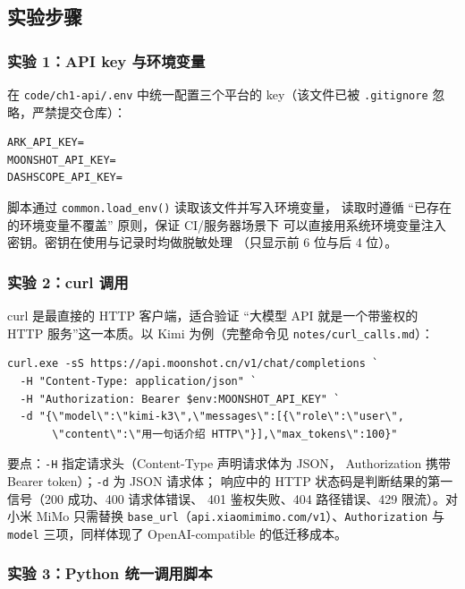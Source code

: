 \subsection{实验步骤}

\subsubsection{实验 1：API key 与环境变量}

在 \texttt{code/ch1-api/.env} 中统一配置三个平台的 key（该文件已被
\texttt{.gitignore} 忽略，严禁提交仓库）：

\begin{verbatim}
ARK_API_KEY=
MOONSHOT_API_KEY=
DASHSCOPE_API_KEY=
\end{verbatim}

脚本通过 \texttt{common.load\_env()} 读取该文件并写入环境变量，
读取时遵循 ``已存在的环境变量不覆盖'' 原则，保证 CI/服务器场景下
可以直接用系统环境变量注入密钥。密钥在使用与记录时均做脱敏处理
（只显示前 6 位与后 4 位）。

\subsubsection{实验 2：curl 调用}

curl 是最直接的 HTTP 客户端，适合验证 ``大模型 API 就是一个带鉴权的 HTTP
服务''这一本质。以 Kimi 为例（完整命令见 \texttt{notes/curl\_calls.md}）：

\begin{verbatim}
curl.exe -sS https://api.moonshot.cn/v1/chat/completions `
  -H "Content-Type: application/json" `
  -H "Authorization: Bearer $env:MOONSHOT_API_KEY" `
  -d "{\"model\":\"kimi-k3\",\"messages\":[{\"role\":\"user\",
       \"content\":\"用一句话介绍 HTTP\"}],\"max_tokens\":100}"
\end{verbatim}

要点：\texttt{-H} 指定请求头（Content-Type 声明请求体为 JSON，
Authorization 携带 Bearer token）；\texttt{-d} 为 JSON 请求体；
响应中的 HTTP 状态码是判断结果的第一信号（200 成功、400 请求体错误、
401 鉴权失败、404 路径错误、429 限流）。对小米 MiMo 只需替换
\texttt{base\_url}（\texttt{api.xiaomimimo.com/v1}）、\texttt{Authorization} 与
\texttt{model} 三项，同样体现了 OpenAI-compatible 的低迁移成本。

\subsubsection{实验 3：Python 统一调用脚本}


